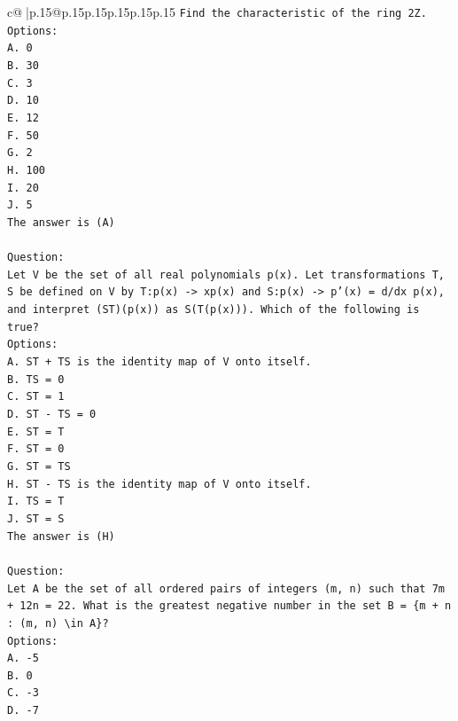 \documentclass{article}
\begin{document}
{\begin{supertabular}{c@{$\;$}|p{.15\linewidth}@{}p{.15\linewidth}p{.15\linewidth}p{.15\linewidth}p{.15\linewidth}p{.15\linewidth}}
{{{\texttt{Find the characteristic of the ring 2Z.} \\
\texttt{Options:} \\
\texttt{A. 0} \\
\texttt{B. 30} \\
\texttt{C. 3} \\
\texttt{D. 10} \\
\texttt{E. 12} \\
\texttt{F. 50} \\
\texttt{G. 2} \\
\texttt{H. 100} \\
\texttt{I. 20} \\
\texttt{J. 5} \\
\texttt{The answer is (A)} \\
\\ 
\texttt{Question:} \\
\texttt{Let V be the set of all real polynomials p(x). Let transformations T, S be defined on V by T:p(x) {-}> xp(x) and S:p(x) {-}> p'(x) = d/dx p(x), and interpret (ST)(p(x)) as S(T(p(x))). Which of the following is true?} \\
\texttt{Options:} \\
\texttt{A. ST + TS is the identity map of V onto itself.} \\
\texttt{B. TS = 0} \\
\texttt{C. ST = 1} \\
\texttt{D. ST {-} TS = 0} \\
\texttt{E. ST = T} \\
\texttt{F. ST = 0} \\
\texttt{G. ST = TS} \\
\texttt{H. ST {-} TS is the identity map of V onto itself.} \\
\texttt{I. TS = T} \\
\texttt{J. ST = S} \\
\texttt{The answer is (H)} \\
\\ 
\texttt{Question:} \\
\texttt{Let A be the set of all ordered pairs of integers (m, n) such that 7m + 12n = 22. What is the greatest negative number in the set B = \{m + n : (m, n) \textbackslash{}in A\}?} \\
\texttt{Options:} \\
\texttt{A. {-}5} \\
\texttt{B. 0} \\
\texttt{C. {-}3} \\
\texttt{D. {-}7} \\
}}}
\end{supertabular}}
\end{document}
